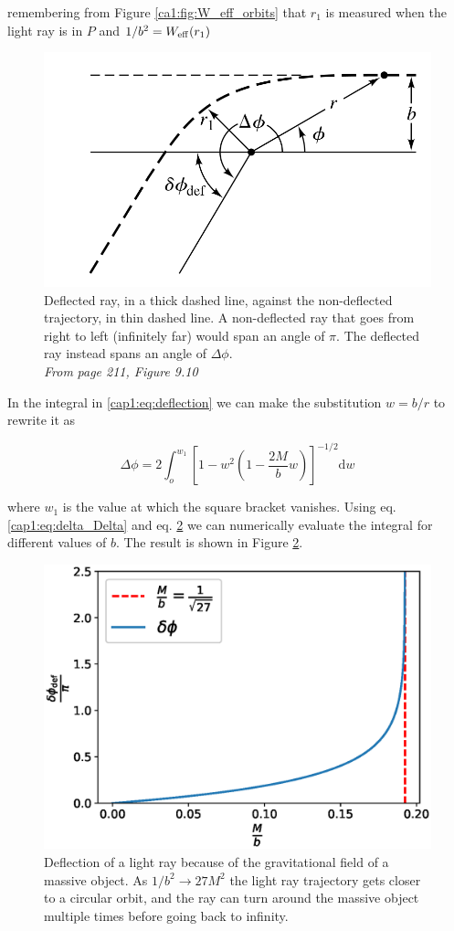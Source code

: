 remembering from Figure \ref{ca1:fig:W_eff_orbits} that $r_1$ is measured when
the light ray is in $P$ and $1 / b^2 = W_{\rm eff}(r_1)$

\begin{figure}[h]
    \centering
    \includegraphics[width = 0.5 \textwidth]{Figures/deflection.png}
    \caption{Deflected ray, in a thick dashed line, against the non-deflected
    trajectory, in thin dashed line.
    A non-deflected ray that goes from right to left (infinitely far) would span
    an angle of $\pi$.
    The deflected ray instead spans an angle of $\Delta \phi$. \\
    \textit{From} \cite{hartle2021gravity} \textit{page 211, Figure 9.10}}
    \label{cap1:fig:deflection}
\end{figure}

In the integral in \ref{cap1:eq:deflection} we can make the substitution
$w = b / r$ to rewrite it as

\begin{equation}
    \Delta \phi = 2 \int_o^{w_1}
    \left[1 - w^2 \left(1 - \frac{2M}{b}w\right)\right]^{-1/2} \mathrm{d}w
    \label{cap1:eq:deflection_w}
\end{equation}

where $w_1$ is the value at which the square bracket vanishes.
Using eq. \ref{cap1:eq:delta_Delta} and eq. \ref{cap1:fig:deflection_w} we can
numerically evaluate the integral for different values of $b$.
The result is shown in Figure \ref{cap1:fig:deflection_w}.

\begin{figure}[h]
    \centering
    \includegraphics[width = 0.65 \textwidth]{Figures/deflection_w.eps}
    \caption{Deflection of a light ray because of the gravitational field of a
    massive object.
    As $1 / b^2 \rightarrow 27 M^2$ the light ray trajectory gets closer to a
    circular orbit, and the ray can turn around the massive object multiple
    times before going back to infinity.}
    \label{cap1:fig:deflection_w}
\end{figure}



